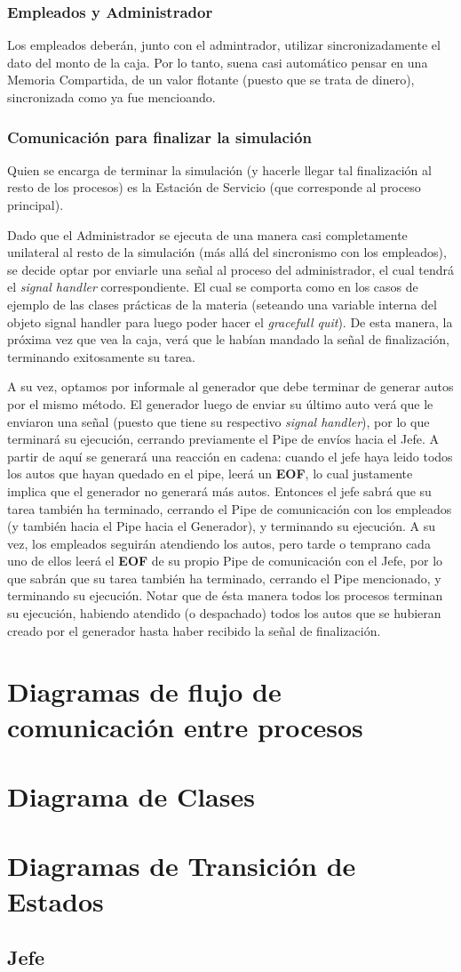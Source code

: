 \documentclass[a4paper,12pt]{article}
\begin{document}
\subsubsection{Empleados y Administrador}
Los empleados deberán, junto con el admintrador, utilizar sincronizadamente el dato del monto de la caja. Por lo tanto, suena casi automático pensar en una Memoria Compartida, de un valor flotante (puesto que se trata de dinero), sincronizada como ya fue mencioando.

\subsubsection{Comunicación para finalizar la simulación}
Quien se encarga de terminar la simulación (y hacerle llegar tal finalización al resto de los procesos) es la Estación de Servicio (que corresponde al proceso principal).

Dado que el Administrador se ejecuta de una manera casi completamente unilateral al resto de la simulación (más allá del sincronismo con los empleados), se decide optar por enviarle una señal al proceso del administrador, el cual tendrá el \textit{signal handler} correspondiente. El cual se comporta como en los casos de ejemplo de las clases prácticas de la materia (seteando una variable interna del objeto signal handler para luego poder hacer el \textit{gracefull quit}). De esta manera, la próxima vez que vea la caja, verá que le habían mandado la señal de finalización, terminando exitosamente su tarea.

A su vez, optamos por informale al generador que debe terminar de generar autos por el mismo método. El generador luego de enviar su último auto verá que le enviaron una señal (puesto que tiene su respectivo \textit{signal handler}), por lo que terminará su ejecución, cerrando previamente el Pipe de envíos hacia el Jefe. A partir de aquí se generará una reacción en cadena: cuando el jefe haya leido todos los autos que hayan quedado en el pipe, leerá un \textbf{EOF}, lo cual justamente implica que el generador no generará más autos. Entonces el jefe sabrá que su tarea también ha terminado, cerrando el Pipe de comunicación con los empleados (y también hacia el Pipe hacia el Generador), y terminando su ejecución. A su vez, los empleados seguirán atendiendo los autos, pero tarde o temprano cada uno de ellos leerá el \textbf{EOF} de su propio Pipe de comunicación con el Jefe, por lo que sabrán que su tarea también ha terminado, cerrando el Pipe mencionado, y terminando su ejecución. Notar que de ésta manera todos los procesos terminan su ejecución, habiendo atendido (o despachado) todos los autos que se hubieran creado por el generador hasta haber recibido la señal de finalización.
\newpage
\section{Diagramas de flujo de comunicación entre procesos}

\newpage


\section{Diagrama de Clases}
\newpage
\section{Diagramas de Transición de Estados}
\subsection{Jefe}
\end{document}
